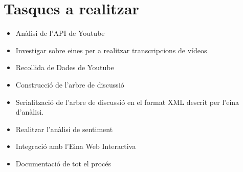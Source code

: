 \documentclass{article}
\begin{document}
	\section{Tasques a realitzar}
	\begin{itemize}
		\item Anàlisi de l'API de Youtube
		\item Investigar sobre eines per a realitzar transcripcions de vídeos
		\item Recollida de Dades de Youtube
		\item Construcció de l'arbre de discussió
		\item Serialització de l'arbre de discussió en el format XML descrit per l'eina d'anàlisi.
		\item Realitzar l'anàlisi de sentiment
		\item Integració amb l'Eina Web Interactiva 
		\item Documentació de tot el procés
	\end{itemize}
\end{document}

